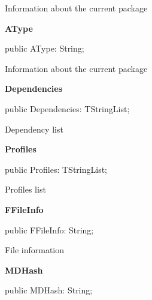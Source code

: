 \documentclass{report}
\newif\ifpdf
\begin{document}
\begin{list}{}
\begin{flushleft}
\ifpdf
\end{flushleft}
\fi


\par Information about the current package\label{mainunit.TIWizFrm-AType}
\item[\textbf{AType}\hfill]
\ifpdf
\begin{flushleft}
\fi
\begin{ttfamily}
public AType: String;\end{ttfamily}

\ifpdf
\end{flushleft}
\fi


\par Information about the current package\label{mainunit.TIWizFrm-Dependencies}
\item[\textbf{Dependencies}\hfill]
\ifpdf
\begin{flushleft}
\fi
\begin{ttfamily}
public Dependencies: TStringList;\end{ttfamily}

\ifpdf
\end{flushleft}
\fi


\par Dependency list\label{mainunit.TIWizFrm-Profiles}
\item[\textbf{Profiles}\hfill]
\ifpdf
\begin{flushleft}
\fi
\begin{ttfamily}
public Profiles: TStringList;\end{ttfamily}

\ifpdf
\end{flushleft}
\fi


\par Profiles list\label{mainunit.TIWizFrm-FFileInfo}
\item[\textbf{FFileInfo}\hfill]
\ifpdf
\begin{flushleft}
\fi
\begin{ttfamily}
public FFileInfo: String;\end{ttfamily}

\ifpdf
\end{flushleft}
\fi


\par File information\label{mainunit.TIWizFrm-MDHash}
\item[\textbf{MDHash}\hfill]
\ifpdf
\begin{flushleft}
\fi
\begin{ttfamily}
public MDHash: String;\end{ttfamily}


\end{flushleft}
\end{list}
\end{document}
